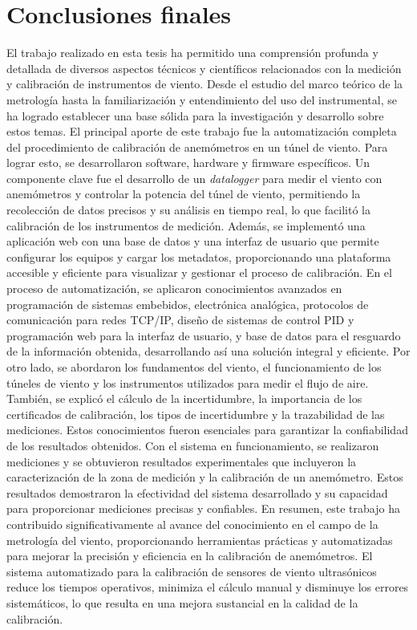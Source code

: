 \section{Conclusiones finales}
El trabajo realizado en esta tesis ha permitido una comprensión profunda y detallada de diversos aspectos técnicos y científicos relacionados con la medición y calibración de instrumentos de viento. Desde el estudio del marco teórico de la metrología hasta la familiarización y entendimiento del uso del instrumental, se ha logrado establecer una base sólida para la investigación y desarrollo sobre estos temas. El principal aporte de este trabajo fue la automatización completa del procedimiento de calibración de anemómetros en un túnel de viento. Para lograr esto, se desarrollaron software, hardware y firmware específicos. Un componente clave fue el desarrollo de un \textit{datalogger} para medir el viento con anemómetros y controlar la potencia del túnel de viento, permitiendo la recolección de datos precisos y su análisis en tiempo real, lo que facilitó la calibración de los instrumentos de medición. Además, se implementó una aplicación web con una base de datos y una interfaz de usuario que permite configurar los equipos y cargar los metadatos, proporcionando una plataforma accesible y eficiente para visualizar y gestionar el proceso de calibración. En el proceso de automatización, se aplicaron conocimientos avanzados en programación de sistemas embebidos, electrónica analógica, protocolos de comunicación para redes TCP/IP, diseño de sistemas de control PID y programación web para la interfaz de usuario, y base de datos para el resguardo de la información obtenida, desarrollando así una solución integral y eficiente. Por otro lado, se abordaron los fundamentos del viento, el funcionamiento de los túneles de viento y los instrumentos utilizados para medir el flujo de aire. También, se explicó el cálculo de la incertidumbre, la importancia de los certificados de calibración, los tipos de incertidumbre y la trazabilidad de las mediciones. Estos conocimientos fueron esenciales para garantizar la confiabilidad de los resultados obtenidos. Con el sistema en funcionamiento, se realizaron mediciones y se obtuvieron resultados experimentales que incluyeron la caracterización de la zona de medición y la calibración de un anemómetro. Estos resultados demostraron la efectividad del sistema desarrollado y su capacidad para proporcionar mediciones precisas y confiables. En resumen, este trabajo ha contribuido significativamente al avance del conocimiento en el campo de la metrología del viento, proporcionando herramientas prácticas y automatizadas para mejorar la precisión y eficiencia en la calibración de anemómetros. El sistema automatizado para la calibración de sensores de viento ultrasónicos reduce los tiempos operativos, minimiza el cálculo manual y disminuye los errores sistemáticos, lo que resulta en una mejora sustancial en la calidad de la calibración.

